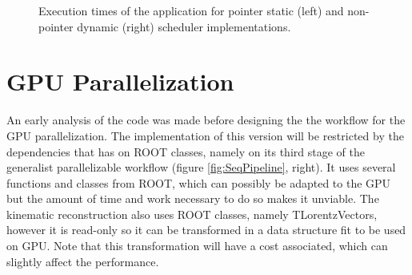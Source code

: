 \begin{figure}[!htp]
	\begin{center}
		\caption{Execution times of the \tth application for pointer static (left) and non-pointer dynamic (right) scheduler implementations.}
		\label{fig:ExecTimes}
	\end{center}
\end{figure}

\section{GPU Parallelization}
\label{Parallelization:GPU}

An early analysis of the code was made before designing the the workflow for the GPU parallelization. The implementation of this version will be restricted by the dependencies that \ttDilepKinFit has on ROOT classes, namely on its third stage of the generalist parallelizable workflow (figure \ref{fig:SeqPipeline}, right). It uses several functions and classes from ROOT, which can possibly be adapted to the GPU but the amount of time and work necessary to do so makes it unviable. The kinematic reconstruction also uses ROOT classes, namely TLorentzVectors, however it is read-only so it can be transformed in a data structure fit to be used on GPU. Note that this transformation will have a cost associated, which can slightly affect the performance.

